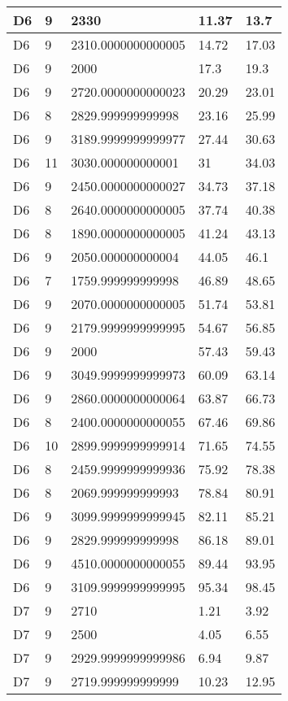 \begin{longtable}{|l|l|l|l|l|}
D6 & 9 & 2330 & 11.37 & 13.7 \\ \hline
D6 & 9 & 2310.0000000000005 & 14.72 & 17.03 \\ \hline
D6 & 9 & 2000 & 17.3 & 19.3 \\ \hline
D6 & 9 & 2720.0000000000023 & 20.29 & 23.01 \\ \hline
D6 & 8 & 2829.999999999998 & 23.16 & 25.99 \\ \hline
D6 & 9 & 3189.9999999999977 & 27.44 & 30.63 \\ \hline
D6 & 11 & 3030.000000000001 & 31 & 34.03 \\ \hline
D6 & 9 & 2450.0000000000027 & 34.73 & 37.18 \\ \hline
D6 & 8 & 2640.0000000000005 & 37.74 & 40.38 \\ \hline
D6 & 8 & 1890.0000000000005 & 41.24 & 43.13 \\ \hline
D6 & 9 & 2050.000000000004 & 44.05 & 46.1 \\ \hline
D6 & 7 & 1759.999999999998 & 46.89 & 48.65 \\ \hline
D6 & 9 & 2070.0000000000005 & 51.74 & 53.81 \\ \hline
D6 & 9 & 2179.9999999999995 & 54.67 & 56.85 \\ \hline
D6 & 9 & 2000 & 57.43 & 59.43 \\ \hline
D6 & 9 & 3049.9999999999973 & 60.09 & 63.14 \\ \hline
D6 & 9 & 2860.0000000000064 & 63.87 & 66.73 \\ \hline
D6 & 8 & 2400.0000000000055 & 67.46 & 69.86 \\ \hline
D6 & 10 & 2899.9999999999914 & 71.65 & 74.55 \\ \hline
D6 & 8 & 2459.9999999999936 & 75.92 & 78.38 \\ \hline
D6 & 8 & 2069.999999999993 & 78.84 & 80.91 \\ \hline
D6 & 9 & 3099.9999999999945 & 82.11 & 85.21 \\ \hline
D6 & 9 & 2829.999999999998 & 86.18 & 89.01 \\ \hline
D6 & 9 & 4510.0000000000055 & 89.44 & 93.95 \\ \hline
D6 & 9 & 3109.9999999999995 & 95.34 & 98.45 \\ \hline
D7 & 9 & 2710 & 1.21 & 3.92 \\ \hline
D7 & 9 & 2500 & 4.05 & 6.55 \\ \hline
D7 & 9 & 2929.9999999999986 & 6.94 & 9.87 \\ \hline
D7 & 9 & 2719.999999999999 & 10.23 & 12.95 \\ \hline

\end{longtable}
